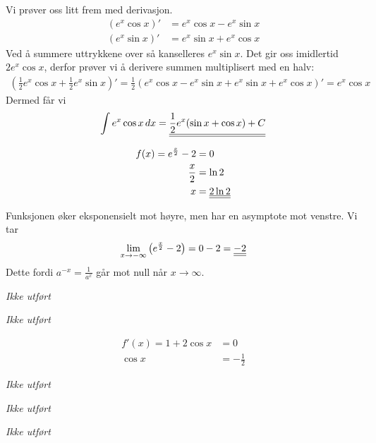 \documentclass[a4paper,norsk,12pt]{article}
\begin{document}
Vi prøver oss litt frem med derivasjon.
\begin{align*}
  (e^x \cos{x})' &= e^x\cos{x} - e^x\sin{x} \\
  (e^x \sin{x})' &= e^x\sin{x} + e^x\cos{x}
\end{align*}
Ved å summere uttrykkene over så kanselleres $e^x\sin{x}$. Det gir oss
imidlertid $2e^x\cos{x}$, derfor prøver vi å derivere summen multiplisert med
en halv:
\begin{align*}
  \left( \frac{1}{2}e^x \cos{x} +
         \frac{1}{2}e^x \sin{x} \right)' =
    \frac{1}{2} \left( 
        e^x\cos{x}-e^x\sin{x} + e^x\sin{x} + e^x\cos{x}
      \right)' = e^x\cos{x}
\end{align*}
Dermed får vi
\begin{align*}
  \int{e^x\cos{x}} \,dx = 
  {\underline{\underline{ \frac{1}{2}e^x( \sin{x} + \cos{x} ) + C }}}
\end{align*}


\begin{align*}
  f(x) = e^\frac{x}{2} - 2 &= 0 \\
  \frac{x}{2} &= \ln{2} \\
  x &= {\underline{\underline{ 2\ln{2} }}}
\end{align*}

Funksjonen øker eksponensielt mot høyre, men har en asymptote mot venstre. Vi
tar
\begin{align*}
  \lim_{x\to -\infty}{\left( e^\frac{x}{2}-2 \right)} = 0 - 2 = {\underline{\underline{-2}}}
\end{align*}
Dette fordi $a^{-x} = \frac{1}{a^x}$ går mot null når $x\to\infty$.

\textit{Ikke utført}

\textit{Ikke utført}

\begin{align*}
  f'(x) = 1 + 2\cos{x} & = 0\\
  \cos{x} & = -\frac{1}{2}
\end{align*}

\textit{Ikke utført}

\textit{Ikke utført}

\textit{Ikke utført}
\end{document}

